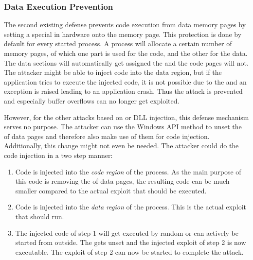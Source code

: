 \subsubsection{Data Execution Prevention}
The second existing defense prevents code execution from data memory pages by setting a special  \cite{msdn_dep} in hardware onto the memory page. This protection is done by default for every started process. A process will allocate a certain number of memory pages, of which one part is used for the code, and the other for the data. The data sections will automatically get assigned the  and the code pages will not. The attacker might be able to inject code into the data region, but if the application tries to execute the injected code, it is not possible due to the  and an exception is raised leading to an application crash. Thus the attack is prevented and especially buffer overflows can no longer get exploited.

However, for the other attacks based on  or DLL injection, this defense mechanism serves no purpose. The attacker can use the Windows \gls{API} method  \cite{msdn_virtualprotect} to unset the  of data pages and therefore also make use of them for code injection. Additionally, this change might not even be needed. The attacker could do the code injection in a two step manner: 
\begin{enumerate}
\item Code is injected into the \emph{code region} of the process. As the main purpose of this code is removing the  of data pages, the resulting code can be much smaller compared to the actual exploit that should be executed.
\item Code is injected into the \emph{data region} of the process. This is the actual exploit that should run.
\item The injected code of step 1 will get executed by random or can actively be started from outside. The  gets unset and the injected exploit of step 2 is now executable. The exploit of step 2 can now be started to complete the attack.
\end{enumerate}